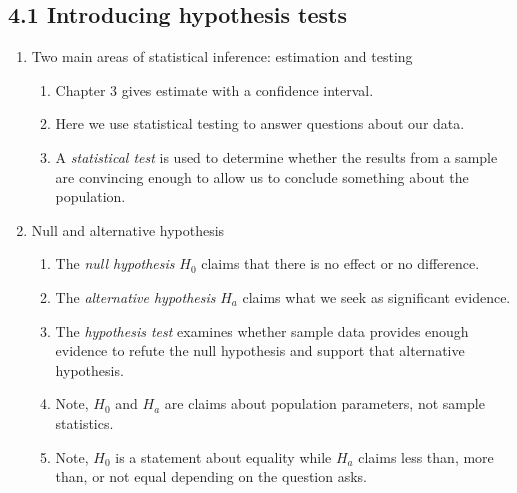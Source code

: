 \documentclass{article}
\begin{document}
\subsection{4.1 Introducing hypothesis tests}
\begin{enumerate}

\item Two main areas of statistical inference: estimation and testing
\begin{enumerate}
\item Chapter 3 gives estimate with a confidence interval.
\item Here we use statistical testing to answer questions about our data.
\item A \emph{statistical test} is used to determine whether the results from a sample are convincing enough to allow us to conclude something about the population.
\end{enumerate}

\item Null and alternative hypothesis
\begin{enumerate}
\item The \emph{null hypothesis} $H_0$ claims that there is no effect or no difference.
\item The \emph{alternative hypothesis} $H_a$ claims what we seek as significant evidence.
\item The \emph{hypothesis test} examines whether sample data provides enough evidence to refute the null hypothesis and support that alternative hypothesis.
\item Note, $H_0$ and $H_a$ are claims about population parameters, not sample statistics.
\item Note, $H_0$ is a statement about equality while $H_a$ claims less than, more than, or not equal depending on the question asks.
\end{enumerate}

\end{enumerate}

\end{document}
